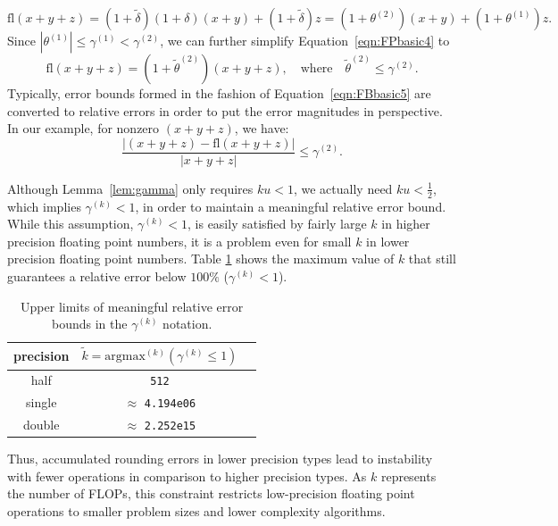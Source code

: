 \documentclass[review,onefignum,onetabnum]{siamart190516}
\newcommand{\dd}{\delta}
\newcommand{\tth}{\theta}
\newcommand{\fl}{\mathrm{fl}}
\begin{document}
\begin{equation}
\fl(x+y+z) = (1+\tilde{\dd})(1+\dd) (x+y) + (1+\tilde{\dd})z = (1+\tth^{(2)})(x+y) + (1+\tth^{(1)})z. \label{eqn:FPbasic4}
\end{equation}
Since $|\tth^{(1)}| \leq \gamma^{(1)} < \gamma^{(2)}$, we can further simplify Equation~\ref{eqn:FPbasic4} to
\begin{equation}
\fl(x+y+z) = (1+\tilde{\tth}^{(2)})(x+y+z), \quad \mbox{where} \quad \tilde{\tth}^{(2)} \leq \gamma^{(2)}. \label{eqn:FBbasic5}
\end{equation}
Typically, error bounds formed in the fashion of Equation~\ref{eqn:FBbasic5} are converted to relative errors in order to put the error magnitudes in perspective. 
In our example, for nonzero $(x+y+z)$, we have:
\begin{equation}
\frac{|(x+y+z) - \fl(x+y+z)|}{|x+y+z|} \leq \gamma^{(2)}.
\end{equation}

Although Lemma~\ref{lem:gamma} only requires $ku<1$, we actually need $ku <\frac{1}{2}$, which implies $\gamma^{(k)} <1$, in order to maintain a meaningful relative error bound.
While this assumption, $\gamma^{(k)} < 1$, is easily satisfied by fairly large $k$ in higher precision floating point numbers, it is a problem even for small $k$ in lower precision floating point numbers.
Table \ref{table:ieeen} shows the maximum value of $k$ that still guarantees a relative error below $100\%$ ($\gamma^{(k)} < 1$). 
\begin{table}[h]
	\centering
	\begin{tabular}{||c|c|c||} 
		\hline
		precision &$\tilde{k} = \mathrm{argmax}^{(k)}(\gamma^{(k)} \leq 1)$ \\ \hline
		half & {\tt 512}\\
		single & $\approx$ {\tt 4.194e06} \\ 
		double &  $\approx$ {\tt 2.252e15}\\ \hline 
	\end{tabular}
	\caption{Upper limits of meaningful relative error bounds in the $\gamma^{(k)}$ notation.}
	\label{table:ieeen}
\end{table}
Thus, accumulated rounding errors in lower precision types lead to instability with fewer operations in comparison to higher precision types.
As $k$ represents the number of FLOPs, this constraint restricts low-precision floating point operations to smaller problem sizes and lower complexity algorithms.
\end{document}
